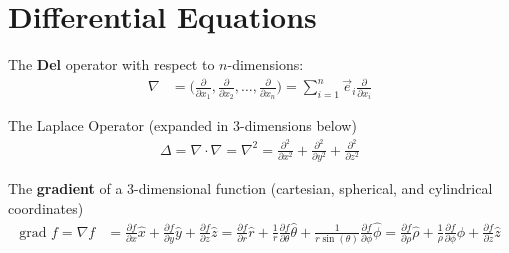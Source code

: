 \chapter{Differential Equations}
\thispagestyle{fancy}
\begin{defn}{1}
	The \textbf{Del} operator with respect to $n$-dimensions:
\begin{align}
\nabla &= \bigg( \frac{\partial}{\partial x_1}, \frac{\partial}{\partial x_2}, \dots, \frac{\partial}{\partial x_n} \bigg) = \sum_{i=1}^{n}\vec{e}_i\frac{\partial}{\partial x_i}
\end{align}
\end{defn}

\begin{defn}{1}
	The Laplace Operator (expanded in 3-dimensions below)
	\begin{align}
		\Delta = \nabla \cdot \nabla = \nabla^2 =  \frac{\partial^2}{\partial x^2}+ \frac{\partial^2}{\partial y^2}+ \frac{\partial^2}{\partial z^2}
	\end{align}
\end{defn}

\begin{defn}{1}
The \textbf{gradient} of a 3-dimensional function (cartesian, spherical, and cylindrical coordinates)
\begin{align}
\textrm{grad } f = \nabla f &= \frac{\partial f}{\partial x}\hat{x}+\frac{\partial f}{\partial y}\hat{y}+\frac{\partial f}{\partial z}\hat{z} =\frac{\partial f}{\partial r}\hat{r}+\frac{1}{r}\frac{\partial f}{\partial \theta}\hat{\theta}+\frac{1}{r\sin(\theta)}\frac{\partial f}{\partial \phi}\hat{\phi} =\frac{\partial f}{\partial \rho}\hat{\rho}+\frac{1}{\rho}\frac{\partial f}{\partial \phi}\hat{\phi}+\frac{\partial f}{\partial z}\hat{z}
\end{align}
\end{defn}

